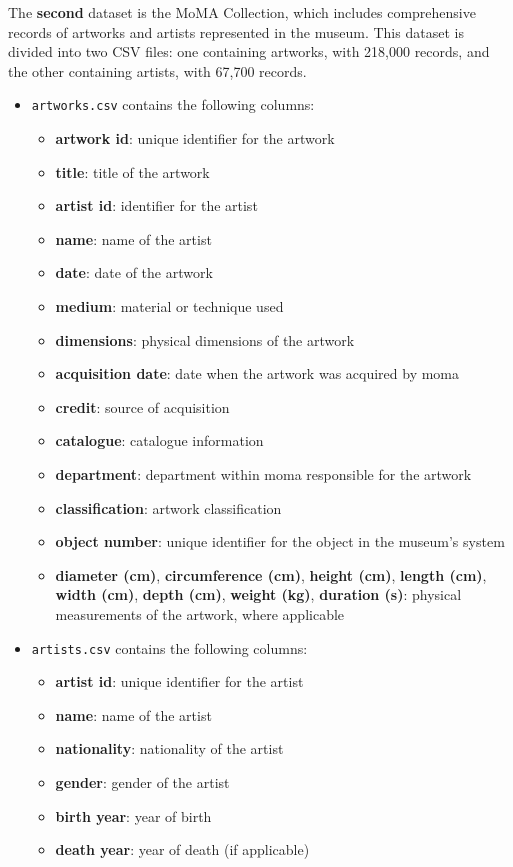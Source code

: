 \documentclass[a4paper,12pt]{article}
\begin{document}
The \textbf{second} dataset is the MoMA Collection, which includes comprehensive records of artworks and artists represented in the museum. This dataset is divided into two CSV files: one containing artworks, with 218,000 records, and the other containing artists, with 67,700 records.
\begin{itemize}
    \item \texttt{artworks.csv} contains the following columns:
          \begin{itemize}
              \item \textbf{artwork id}: unique identifier for the artwork
              \item \textbf{title}: title of the artwork
              \item \textbf{artist id}: identifier for the artist
              \item \textbf{name}: name of the artist
              \item \textbf{date}: date of the artwork
              \item \textbf{medium}: material or technique used
              \item \textbf{dimensions}: physical dimensions of the artwork
              \item \textbf{acquisition date}: date when the artwork was acquired by moma
              \item \textbf{credit}: source of acquisition
              \item \textbf{catalogue}: catalogue information
              \item \textbf{department}: department within moma responsible for the artwork
              \item \textbf{classification}: artwork classification
              \item \textbf{object number}: unique identifier for the object in the museum’s system
              \item \textbf{diameter (cm)}, \textbf{circumference (cm)}, \textbf{height (cm)}, \textbf{length (cm)}, \textbf{width (cm)}, \textbf{depth (cm)}, \textbf{weight (kg)}, \textbf{duration (s)}: physical measurements of the artwork, where applicable

          \end{itemize}

    \item \texttt{artists.csv} contains the following columns:
          \begin{itemize}
              \item \textbf{artist id}: unique identifier for the artist
              \item \textbf{name}: name of the artist
              \item \textbf{nationality}: nationality of the artist
              \item \textbf{gender}: gender of the artist
              \item \textbf{birth year}: year of birth
              \item \textbf{death year}: year of death (if applicable)
          \end{itemize}
\end{itemize}
\end{document}
